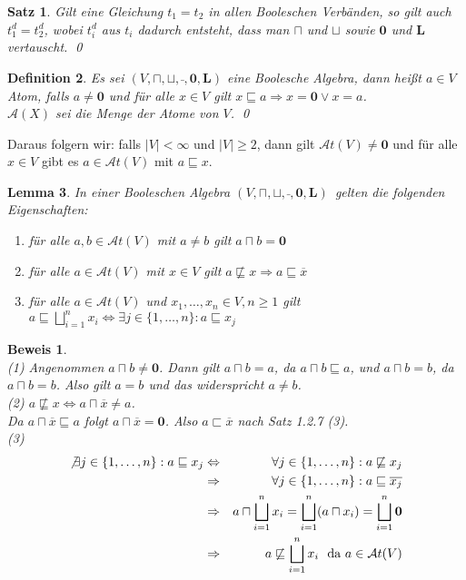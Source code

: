 \documentclass[ngerman]{scrartcl}
\theoremstyle{custom}
\newtheorem{mdef}{Definition} \numberwithin{mdef}{subsection}
\newtheorem{ms}[mdef]{Satz}
\newtheorem{ml}[mdef]{Lemma}
\newtheorem*{bw}{Beweis}
\newcommand{\ax}{\mathcal{A}(X)}
\newcommand{\0}{\mathbf{0}}
\newcommand{\1}{\mathbf{L}}
\newcommand{\at}{\mathcal{A}t}
\newcommand{\ba}{$(V, \sqcap, \sqcup, \bar~, \0, \1)$}
\begin{document}
\begin{ms}
Gilt eine Gleichung $t_1 = t_2$ in allen Booleschen Verb\"anden, so
gilt auch $t_1^d = t_2^d$, wobei $t_i^d$ aus $t_i$ dadurch entsteht,
dass man $\sqcap$ und $\sqcup$ sowie $\0$ und $\1$ vertauscht.
\qed
\end{ms}

\begin{mdef}
Es sei $(V,\sqcap, \sqcup, \bar~, \0, \1)$ eine Boolesche Algebra,
dann hei\ss t $a \in V$ \emph{Atom}, falls $a \not= \0$ und
f\"ur alle $x \in V$ gilt $x \sqsubseteq a \Rightarrow x = \0 \vee x =
a$. \\
$\ax$ sei die Menge der Atome von $V$.
\qed
\end{mdef}

Daraus folgern wir: falls $\vert V \vert < \infty$ und $\vert V \vert
\geq 2$, dann gilt $\at(V) \not= \0$ und f\"ur alle $x \in V$ gibt es
$a \in \at(V)$ mit $a \sqsubseteq x$.

\begin{ml}
In einer Booleschen Algebra \ba ~gelten die folgenden Eigenschaften:
\begin{enumerate}
\item f\"ur alle $a, b \in \at(V)$ mit $a \not= b$ gilt $a \sqcap b =
  \0$
\item f\"ur alle $a \in \at(V)$ mit $x \in V$ gilt $a \not \sqsubseteq
  x \Rightarrow a \sqsubseteq \overline{x}$
\item f\"ur alle $a \in \at(V)$ und $x_1, \dots, x_n \in V, n \geq 1$
  gilt $a \sqsubseteq \bigsqcup_{i=1}^{n} x_i \Leftrightarrow \exists
  j \in \{1, \dots, n\}: a \sqsubseteq x_j$
\end{enumerate}
\end{ml}

\begin{bw} ~\\
(1) Angenommen $a \sqcap b \not= \0$. Dann gilt $a \sqcap b = a$, da
$a \sqcap b \sqsubseteq a$, und $a \sqcap b = b$, da $a \sqcap b =
b$. Also gilt $a=b$ und das widerspricht $a \not= b$.\\
(2) $a \not \sqsubseteq x \Leftrightarrow a \sqcap \overline{x} \not =
a$.\\ Da $a \sqcap \overline{x} \sqsubseteq a$ folgt $a \sqcap
\overline{x} = \0$. Also $a \sqsubset \overline{x}$ nach Satz 1.2.7
(3).\\
(3)
\begin{eqnarray*}
\not \exists j \in \{1, \dots, n\}: a \sqsubseteq x_j &\Leftrightarrow&
\forall j \in \{1, \dots, n\}: a \not \sqsubseteq x_j \\
&\Rightarrow& \forall j \in \{1, \dots, n\}: a \sqsubseteq
\overline{x_j} \\
&\Rightarrow& a \sqcap \bigsqcup_{i=1}^{n} x_i = \bigsqcup_{i=1}^{n}
(a \sqcap x_i) = \bigsqcup_{i=1}^{n} \0 \\
&\Rightarrow& a \not \sqsubseteq \bigsqcup_{i=1}^{n} x_i ~\text{ da }a
  \in \at(V)
\end{eqnarray*}
\end{bw}
\end{document}
